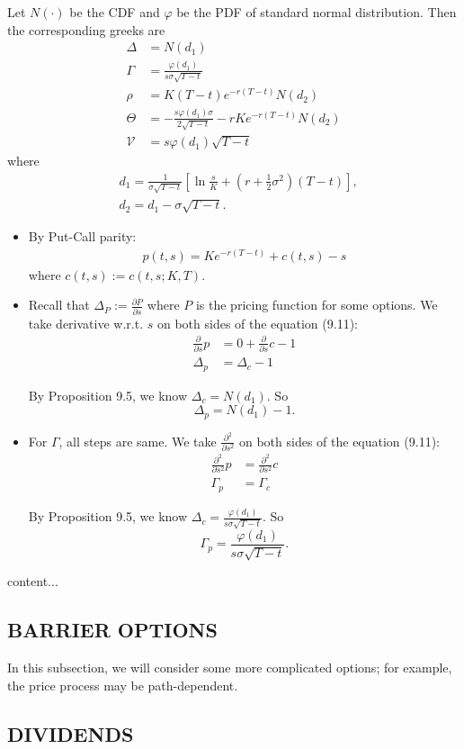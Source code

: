 \begin{example}
	Let $N(\cdot)$ be the CDF and $\varphi$ be the PDF of standard normal distribution. Then the corresponding greeks are 
	\begin{align*}
		\Delta &= N(d_1)\\
		\Gamma &= \frac{\varphi(d_1)}{s\sigma \sqrt{T-t}} \\
		\rho &= K(T-t) e^{-r(T-t)} N(d_2) \\
		\Theta &= - \frac{s \varphi(d_1) \sigma}{2\sqrt{T-t}} - rK e^{-r(T-t)}N(d_2) \\
		\mathcal{V} &= s \varphi(d_1)\sqrt{T-t} 
	\end{align*}
	where 
	\begin{align*}
	& d_1 =  \frac{1}{ \sigma \sqrt{T-t} } \left[  \ln\frac{s}{K} + (r + \frac{1}{2}\sigma^2)(T-t)   \right], \\
	& d_2 = d_1 - \sigma \sqrt{ T - t }.
	\end{align*}
\end{example}

\begin{example}
	\begin{itemize}
		\item By Put-Call parity:
		\begin{align*}
		p(t,s) = Ke^{-r(T-t)} + c(t,s) - s \tag{9.11}
		\end{align*}
		where $c(t,s):= c(t, s; K, T)$.
		
		\item Recall that $\Delta_P:= \frac{\partial P}{\partial s}$ where $P$ is the pricing function for some options.  We take derivative w.r.t. $s$ on both sides of the equation (9.11):
		\begin{align*}
		\frac{\partial }{\partial s} p &= 0 + \frac{\partial }{\partial s} c - 1 \\
		\Delta_p &= \Delta_c - 1
		\end{align*}
		
		By Proposition 9.5, we know $\Delta_c = N(d_1)$. So 
		$$\Delta_p = N(d_1) - 1.$$
		
		\item For $\Gamma$, all steps are same. We take $\frac{\partial^2}{\partial s^2}$ on both sides of the equation (9.11):
		\begin{align*}
		\frac{\partial^2}{\partial s^2} p &= \frac{\partial^2}{\partial s^2} c \\
		\Gamma_p &= \Gamma_c
		\end{align*}
		
		By Proposition 9.5, we know $\Delta_c = \frac{\varphi(d_1)}{ s\sigma \sqrt{T-t} }$. So
		$$\Gamma_p = \frac{\varphi(d_1)}{ s\sigma \sqrt{T-t} }.$$
	\end{itemize}
\end{example}


\begin{thm}
	content...
\end{thm}

\subsection*{BARRIER OPTIONS}
In this subsection, we will consider some more complicated options; for example, the price process may be path-dependent.   

\subsection*{DIVIDENDS}
